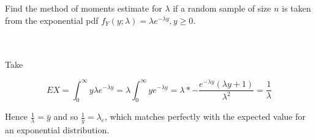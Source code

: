 Find the method of moments estimate for $\lambda$ if a random sample of size $n$ is taken from the
exponential pdf $f_Y(y;\lambda)=\lambda e^{-\lambda y}, y\geq0$.\\\\

\begin{solution}\renewcommand{\qedsymbol}{}\ \\
    Take
    
    $$EX=\int_0^{\infty}y\lambda e^{-\lambda y}
    =\lambda\int_0^{\infty}ye^{-\lambda y}=\lambda*-\frac{e^{-\lambda y}(\lambda y+1)}{\lambda^2}
    =\frac{1}{\lambda}$$
    
    Hence $\frac{1}{\lambda}=\bar{y}$ and so $\frac{1}{\bar{y}}=\lambda_e$, which matches perfectly
    with the expected value for an exponential distribution.

\end{solution}
